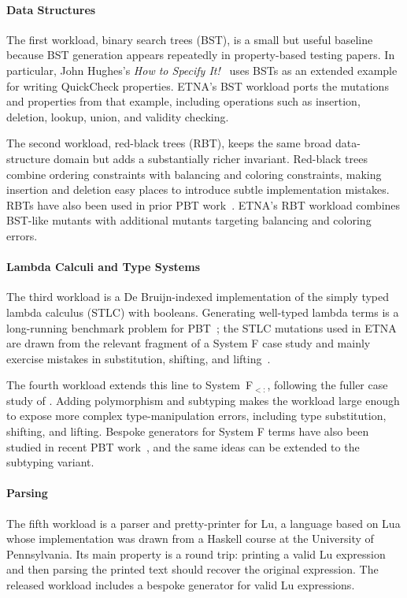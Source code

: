 \paragraph*{Data Structures} The first workload, binary search trees (BST), is a small but
useful baseline because BST generation appears repeatedly in property-based testing
papers. In particular, John Hughes's \emph{How to Specify It!}~\cite{Hughes2019HowTS}
uses BSTs as an extended example for writing QuickCheck properties. ETNA's BST workload
ports the mutations and properties from that example, including operations such as
insertion, deletion, lookup, union, and validity checking.

The second workload, red-black trees (RBT), keeps the same broad data-structure domain
but adds a substantially richer invariant. Red-black trees combine ordering constraints
with balancing and coloring constraints, making insertion and deletion easy places to
introduce subtle implementation mistakes. RBTs have also been used in prior PBT
work~\cite{Luck,RuncimanNL08,MistaR19B,Klein09}. ETNA's RBT workload combines BST-like
mutants with additional mutants targeting balancing and coloring errors.

\paragraph*{Lambda Calculi and Type Systems} The third workload is a De Bruijn-indexed
implementation of the simply typed lambda calculus (STLC) with booleans. Generating
well-typed lambda terms is a long-running benchmark problem for
PBT~\cite{PalkaAST11,MidtgaardNPFH17}; the STLC mutations used in ETNA are drawn from
the relevant fragment of a System F case study and mainly exercise mistakes in
substitution, shifting, and lifting~\cite{CombinatorialPBT}.

The fourth workload extends this line to System~F$_{<:}$, following the fuller case
study of \citet{CombinatorialPBT}. Adding polymorphism and subtyping makes the workload
large enough to expose more complex type-manipulation errors, including type
substitution, shifting, and lifting. Bespoke generators for System F terms have also
been studied in recent PBT work~\cite{CombinatorialPBT,BlockchainTesting}, and the same
ideas can be extended to the subtyping variant.

\paragraph*{Parsing} The fifth workload is a parser and pretty-printer for Lu, a language
based on Lua whose implementation was drawn from a Haskell course at the University of
Pennsylvania. Its main property is a round trip: printing a valid Lu expression and
then parsing the printed text should recover the original expression. The released
workload includes a bespoke generator for valid Lu expressions.


